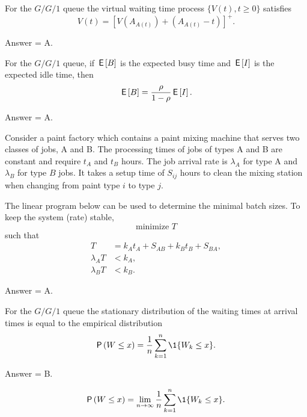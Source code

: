 \begin{exercise}[201704]%
For the $G/G/1$ queue the virtual waiting time process $\{V(t), t\geq 0\}$ 
satisfies
      \begin{equation*}
        V(t) = [V(A_{A(t)}) + (A_{A(t)}-t)]^+.
      \end{equation*}
\begin{solution} Answer = A.
\end{solution}
\end{exercise}

\begin{exercise}[201704]%
  For the $G/G/1$ queue, if $\,\mathsf{E}\left[B\right]$ is the expected busy time and
  $\,\mathsf{E}\left[I\right]$ is the expected idle time, then
\begin{equation*}
  \,\mathsf{E}\left[B\right] = \frac{\rho }{1-\rho} \,\mathsf{E}\left[I\right]. 
\end{equation*}
\begin{solution} Answer = A.
\end{solution}
\end{exercise}

\begin{exercise}[201704]%
  Consider a paint factory which contains a paint mixing machine that
  serves two classes of jobs, A and B. The processing times of jobs of
  types A and B are constant and require $t_A$ and $t_B$ hours. The
  job arrival rate is $\lambda_A$ for type A and $\lambda_B$ for type
  $B$ jobs. It takes a setup time of $S_{i j}$ hours to clean the mixing
  station when changing from paint type $i$ to type $j$.

  The linear program below can be used to determine the minimal batch
  sizes.  To keep the system (rate) stable,
\begin{equation*}
  \text{minimize }  T
\end{equation*}
such that
\begin{align*}
 T&=  k_A t_A + S_{AB} + k_B t_B + S_{BA}, \\
 \lambda_A T &< k_A,  \\
 \lambda_B T &< k_B.
\end{align*}

\begin{solution} Answer = A.
\end{solution}
\end{exercise}

\begin{exercise}[201704]%
  For the $G/G/1$ queue the stationary distribution  of
  the waiting times at arrival times is equal to the empirical distribution
\begin{equation*}
  \P{W \leq x}  =  \frac 1n\sum_{k=1}^n \1{W_k\leq x}.
\end{equation*}
\begin{solution} Answer = B.
  
\begin{equation}
  \P{W \leq x}  = \lim_{n\to\infty} \frac 1n\sum_{k=1}^n \1{W_k\leq x}.
\end{equation}

\end{solution}
\end{exercise}



